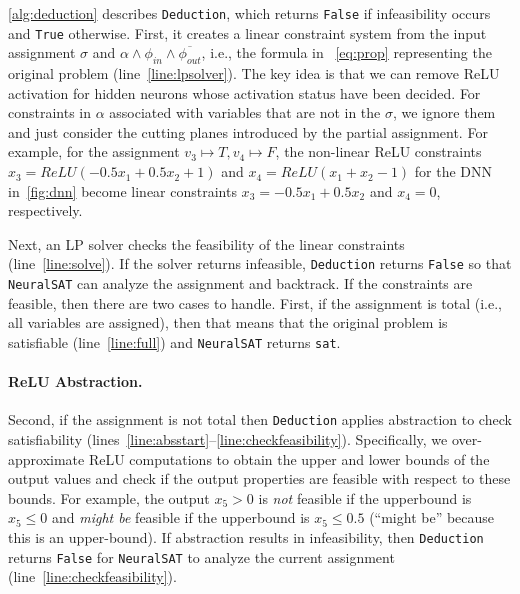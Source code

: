 \documentclass[oneside,11pt,dvipsnames]{book}
\numberwithin{equation}{section}
\theoremstyle{definition}
\theoremstyle{remark}
\newcommand{\hd}[1]{\iftoggle{usecomment}{{\color{blue}{[HD]: #1}}}{}}
\newcommand{\tool}{\texttt{NeuralSAT}}
\begin{document}


\autoref{alg:deduction} describes \texttt{Deduction}, which returns \texttt{False} if infeasibility occurs and  \texttt{True} otherwise.
First, it creates a linear constraint system from the input assignment $\sigma$ and $\alpha \land \phi_{in} \land \overline{\phi_{out}}$, i.e., the formula in ~\autoref{eq:prop} representing the original problem  (line~\ref{line:lpsolver}).
The key idea is that we can remove ReLU activation for hidden neurons whose activation status have been decided.
For constraints in $\alpha$ associated with variables that are not in the $\sigma$,  we ignore them and just consider the cutting planes introduced by the partial assignment.
For example, for the assignment $v_3\mapsto T, v_4 \mapsto F$, the non-linear ReLU constraints $x_3=ReLU(-0.5x_1+0.5x_2+1)$ and  $x_4=ReLU(x_1+x_2-1)$ for the DNN in~\autoref{fig:dnn} become linear constraints $x_3=-0.5x_1+0.5x_2$ and $x_4=0$, respectively.

Next, an LP solver checks the feasibility of the linear constraints (line~\ref{line:solve}).
If the solver returns infeasible,  \texttt{Deduction} returns \texttt{False} so that \tool{} can analyze the assignment and backtrack.
If the constraints are feasible, then there are two cases to handle. First, if the assignment is total (i.e., all variables are assigned), then that means that the original problem is satisfiable (line~\ref{line:full}) and \tool{} returns \texttt{sat}.

\paragraph{ReLU Abstraction.} Second, if the assignment is not total then \texttt{Deduction} applies abstraction to check satisfiability (lines~\ref{line:absstart}--\ref{line:checkfeasibility}).
Specifically, we over-approximate  ReLU computations to obtain the upper and lower bounds of the output values and check if the output properties are feasible with respect to these bounds. For example, the output $x_5 > 0$ is \emph{not} feasible if the upperbound is $x_5 \le 0$ and \emph{might be} feasible if the upperbound is $x_5 \le 0.5$ (``might be'' because this is an upper-bound). If abstraction results in infeasibility, then \texttt{Deduction} returns \texttt{False} for \tool{} to analyze the current assignment (line~\ref{line:checkfeasibility}).
\end{document}
